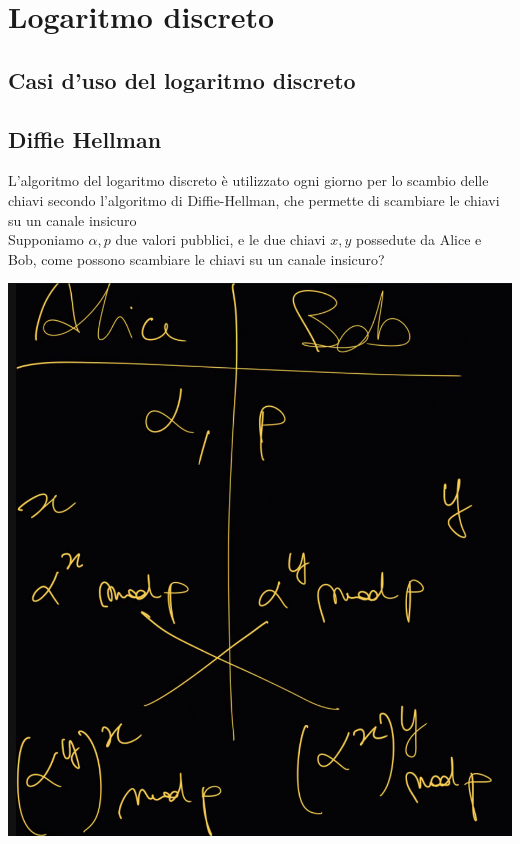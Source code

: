 \documentclass[11pt, oneside]{article}   	%
\begin{document}
\section*{Logaritmo discreto}



\subsection*{Casi d'uso del logaritmo discreto}

\subsection*{Diffie Hellman}
L'algoritmo del logaritmo discreto è utilizzato ogni giorno per lo scambio delle chiavi secondo l'algoritmo di Diffie-Hellman, che permette di scambiare le chiavi su un canale insicuro\\
Supponiamo $\alpha, p$ due valori pubblici, e le due chiavi $x, y$ possedute da Alice e Bob, come possono scambiare le chiavi su un canale insicuro?
\begin{center}
\includegraphics[scale= 0.5]{dellman}
\end{center}
\end{document}
